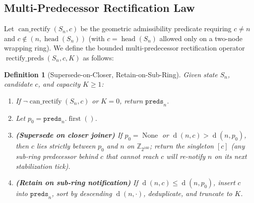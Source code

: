\documentclass[journal]{IEEEtran}
\newtheorem{definition}{Definition}
\newcommand{\Ring}{\mathbb{Z}_{2^{160}}}
\newcommand{\dist}{\operatorname{d}}
\newcommand{\Head}{\operatorname{head}}
\begin{document}
\subsection{Multi-Predecessor Rectification Law}
Let $\operatorname{can\_rectify}(S_n, c)$ be the geometric admissibility
predicate requiring $c \neq n$ and $c \notin (n, \Head(S_n))$ (with
$c = \Head(S_n)$ allowed only on a two-node wrapping ring). We define the
bounded multi-predecessor rectification operator
$\operatorname{rectify\_preds}(S_n, c, K)$ as follows:
\begin{definition}[Supersede-on-Closer, Retain-on-Sub-Ring]
Given state $S_n$, candidate $c$, and capacity $K \ge 1$:
\begin{enumerate}
  \item If $\neg\operatorname{can\_rectify}(S_n, c)$ or $K = 0$, return
  $\texttt{preds}_n$.
  \item Let $p_0 = \texttt{preds}_n.\operatorname{first}()$.
  \item \textbf{(Supersede on closer joiner)} If $p_0 = \operatorname{None}$ or
  $\dist(n, c) > \dist(n, p_0)$, then $c$ lies strictly between $p_0$ and $n$ on
  $\Ring$; return the singleton $[c]$ (any sub-ring predecessor behind $c$ that
  cannot reach $c$ will re-notify $n$ on its next stabilization tick).
  \item \textbf{(Retain on sub-ring notification)} If $\dist(n, c) \le
  \dist(n, p_0)$, insert $c$ into $\texttt{preds}_n$, sort by descending
  $\dist(n, \cdot)$, deduplicate, and truncate to $K$.
\end{enumerate}
\label{def:rectify-preds}
\end{definition}
\end{document}
